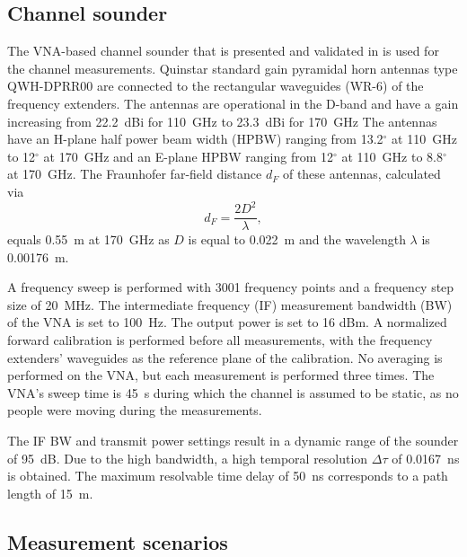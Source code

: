 \documentclass[manuscript]{rsl}
\begin{document}
\subsection{Channel sounder}

The VNA-based channel sounder that is presented and validated in \cite{DeBeelde2021_eucap} is used for the channel measurements.
Quinstar standard gain pyramidal horn antennas type QWH-DPRR00 are connected to the rectangular waveguides (WR-6) of the frequency extenders. 
The antennas are operational in the D-band and have a gain increasing from 22.2~dBi for 110~GHz to 23.3~dBi for 170~GHz
The antennas have an H-plane half power beam width (HPBW) ranging from 13.2$^{\circ}$ at 110~GHz to 12$^{\circ}$ at 170~GHz and an E-plane HPBW ranging from 12$^{\circ}$ at 110~GHz to 8.8$^{\circ}$ at 170~GHz. 
The Fraunhofer far-field distance $d_F$ of these antennas, calculated via
\begin{equation}
\label{eq:Fraunhofer}
d_F = \frac{2 D^2}{\lambda}, 
\end{equation}
equals 0.55~m at 170~GHz as $D$ is equal to 0.022~m and the wavelength $\lambda$ is 0.00176~m.

A frequency sweep is performed with 3001 frequency points and a frequency step size of 20~MHz. 
The intermediate frequency (IF) measurement bandwidth (BW) of the VNA is set to 100~Hz. 
The output power is set to 16 dBm.
A normalized forward calibration is performed before all measurements, with the frequency extenders' waveguides as the reference plane of the calibration. 
No averaging is performed on the VNA, but each measurement is performed three times.
The VNA's sweep time is 45~s during which the channel is assumed to be static, as no people were moving during the measurements. 

The IF BW and transmit power settings result in a dynamic range of the sounder of 95~dB.
Due to the high bandwidth, a high temporal resolution $\Delta\tau$ of 0.0167~ns is obtained.
The maximum resolvable time delay of 50~ns corresponds to a path length of 15~m.

\subsection{Measurement scenarios}
\end{document}
